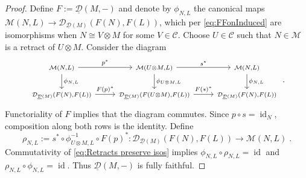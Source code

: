 \documentclass[12pt,dvipsnames]{article}
\numberwithin{equation}{section}
\theoremstyle{definition}
\newcommand{\cat}[1]{\mathcal{#1}}
\newcommand{\1}{\ensuremath{\mathbbm{1}}}
\DeclareMathOperator{\Id}{id}
\newcommand{\blank}{{-}}
\begin{document}
\begin{proof}
    Define $F:=\underline{\cat{D}}(M,\blank)$ and denote by $\phi_{N,L}$ the canonical maps $\cat{M}(N,L)\to \cat{D}_{\underline{\cat{D}}(M)}(F(N),F(L))$, which per \eqref{eq:FFonInduced} are isomorphisms when $N\cong V\otimes M$ for some $V\in\cat{C}$. Choose $U\in\cat{C}$ such that $N\in\cat{M}$ is a retract of $U\otimes M$. Consider the diagram
    \begin{equation}\label{eq:Retracts preserve isos}
        \begin{tikzcd}
            {\scriptstyle \cat{M}(N,L)} & {\scriptstyle \cat{M}(U\otimes M,L)} & {\scriptstyle \cat{M}(N,L)} \\
            {\scriptstyle \cat{D}_{\underline{\cat{D}}(M)}(F(N),F(L))} & {\scriptstyle \cat{D}_{\underline{\cat{D}}(M)}(F(U\otimes M),F(L))} & {\scriptstyle \cat{D}_{\underline{\cat{D}}(M)}(F(N),F(L))}
            \arrow["{p^\ast}", from=1-1, to=1-2]\arrow["{s^\ast}", from=1-2, to=1-3]
            \arrow["{\phi_{N,L}}", from=1-1, to=2-1]\arrow["{\phi_{U\otimes M,L}}", from=1-2, to=2-2]\arrow["{\phi_{N,L}}", from=1-3, to=2-3]
            \arrow["{F(p)^\ast}", from=2-1, to=2-2]\arrow["{F(s)^\ast}", from=2-2, to=2-3]
        \end{tikzcd} \;.
    \end{equation}
    Functoriality of $F$ implies that the diagram commutes. Since $p\circ s = \Id_N$, composition along both rows is the identity. Define
    \begin{equation}
        \rho_{N,L} := s^\ast \circ \phi_{U\otimes M,L}^{-1} \circ F(p)^\ast: \cat{D}_{\underline{\cat{D}}(M)}(F(N),F(L))\to\cat{M}(N,L) \;.
    \end{equation}
    Commutativity of \eqref{eq:Retracts preserve isos} implies $\phi_{N,L}\circ\rho_{N,L} = \Id$ and $\rho_{N,L}\circ\phi_{N,L} = \Id$. Thus $\underline{\cat{D}}(M,\blank)$ is fully faithful.
\end{proof}
\end{document}

